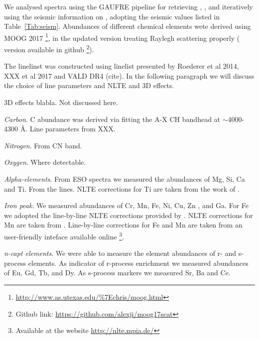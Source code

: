 \documentclass{aa}
\begin{document}
	
	
	
	

We analysed spectra using the GAUFRE pipeline for retrieving \teff , \logg , and \FeH iteratively using the seismic information on \logg , adopting the seismic values listed in Table~\ref{Tab:seism}. Abundances of different chemical elements wete derived using MOOG 2017 \footnote{\url{http://www.as.utexas.edu/\%7Echris/moog.html}}, in the updated version treating Raylegh scattering properly (\cite{Sobeck2011} version available in github \footnote{Github link: \url{https://github.com/alexji/moog17scat}}). 

The linelinst was constructed using linelist presented by Roederer et al 2014, XXX et al 2017 and VALD DR4 (cite). In the following paragraph we will discuss the choice of line parameters and NLTE and 3D effects.

3D effects blabla. Not discussed here.

\textit{Carbon}. C abundance was derived via fitting the A-X CH bandhead at $\sim$4000-4300 \AA. Line parameters from XXX. 

\textit{Nitrogen}. From CN band.

\textit{Oxygen}. Where detectable.

\textit{Alpha-elements}. From ESO spectra we measured the abundances of Mg, Si, Ca and Ti. From the lines. NLTE corrections for Ti are taken from the work of \cite{NLTETi}.

\textit{Iron peak}. We measured abundances of Cr, Mn, Fe, Ni, Cu, Zn , and Ga. For Fe we adopted the line-by-line NLTE corrections provided by \cite{NLTEFe}. NLTE corrections for Mn are taken from \cite{NLTEMn}. Line-by-line corrections for Fe and Mn are taken from an user-friendly inteface available online \footnote{Available at the website \url{http://nlte.mpia.de/}}.

\textit{n-capt elements}. We were able to measure the element abundances of r- and s- process elements. As indicator of r-process enrichment we measured abundances of Eu, Gd, Tb, and Dy. As s-process markers we measured Sr, Ba and Ce.  
\end{document}
